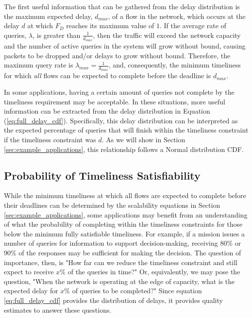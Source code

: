 The first useful information that can be gathered from the delay distribution is the maximum expected delay, $d_{max}$, of a flow in the network, which occurs at the delay $d$ at which $F_{D}$ reaches its maximum value of $1$.  If the average rate of queries, $\lambda$, is greater than $\frac{1}{d_{max}}$, then the traffic will exceed the network capacity and the number of active queries in the system will grow without bound, causing packets to be dropped and/or delays to grow without bound.  Therefore, the maximum query rate is $\lambda_{max} = \frac{1}{d_{max}}$, and, consequently, the minimum timeliness for which \emph{all} flows can be expected to complete before the deadline is $d_{max}$.

In some applications, having a certain amount of queries not complete by the timeliness requirement may be acceptable.  In these situations, more useful information can be extracted from the delay distribution in Equation (\ref{eq:full_delay_cdf}).  Specifically, this delay distribution can be interpreted as the expected percentage of queries that will finish within the timeliness constraint if the timeliness constraint was $d$.  As we will show in Section \ref{sec:example_applications}, this relationship follows a Normal distribution CDF.

\subsection{Probability of Timeliness Satisfiability}

While the minimum timeliness at which all flows are expected to complete before their deadlines can be determined by the scalability equations in Section \ref{sec:example_applications}, some applications may benefit from an understanding of what the probability of completing within the timeliness constraints for those below the minimum fully satisfiable timeliness.  For example, if a mission issues a number of queries for information to support decision-making, receiving $80\%$ or $90\%$ of the responses may be sufficient for making the decision.  The question of importance, then, is "How far can we reduce the timeliness constraint and still expect to receive $x\%$ of the queries in time?"  Or, equivalently, we may pose the question, "When the network is operating at the edge of capacity, what is the expected delay for $x\%$ of queries to be completed?"  Since equation \ref{eq:full_delay_cdf} provides the distribution of delays, it provides quality estimates to answer these questions.  

